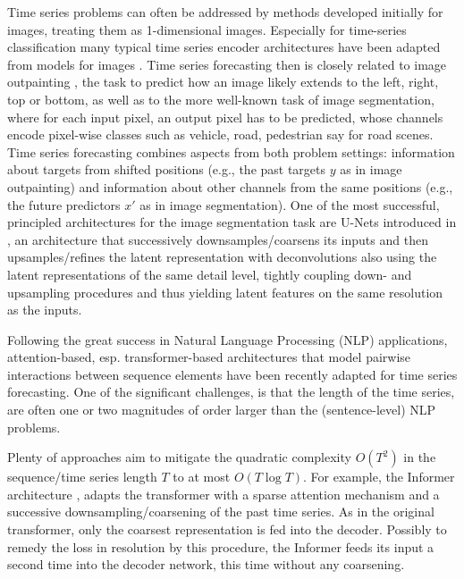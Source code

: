 Time series problems can often be addressed by methods developed initially
for images, treating them as 1-dimensional images. Especially for
time-series classification many typical time series encoder architectures
have been adapted from models for images \cite{wang2017time,ZOU201939}. 
Time series forecasting then is closely related to image outpainting \cite{wang2019srn},
the task to predict how an image likely extends to the left, right, top or bottom,
as well as to the more well-known task of image segmentation,
where for each input pixel, an output pixel has to be predicted, whose channels
encode pixel-wise classes such as vehicle, road, pedestrian say for road scenes.
Time series forecasting combines aspects from both problem settings:
information about targets from shifted positions (e.g., the past targets $y$ as
 in image outpainting) and
information about other channels from the same positions (e.g., the future predictors $x'$
 as in image segmentation).
One of the most successful, principled architectures for the image segmentation
task are U-Nets introduced in \cite{ronneberger2015u}, an architecture that successively downsamples/coarsens
its inputs and then upsamples/refines the latent representation with
deconvolutions also using the latent representations of the same detail level,
tightly coupling down- and upsampling procedures and thus yielding latent
features on the same resolution as the inputs. 


Following the great success in Natural Language Processing (NLP) applications, attention-based, esp. transformer-based
architectures \cite{vaswani2017attention} that model pairwise interactions
between sequence elements have been recently adapted for
time series forecasting. One of the significant
challenges, is that the length of the time series, are often one or two magnitudes of order larger than the (sentence-level) NLP problems. 

Plenty of approaches aim to mitigate the quadratic complexity $O(T^2)$ in
the sequence/time series length $T$ to at most $O(T\log T)$.
For example, the Informer architecture
\cite{zhou2020informer}, adapts the transformer with a sparse attention
mechanism and a successive downsampling/coarsening of the past time series. As in the original transformer, only the coarsest representation is fed
into the decoder. Possibly to remedy the loss in resolution by this procedure,
the Informer feeds its input a second time into the decoder network, this time
without any coarsening. 

